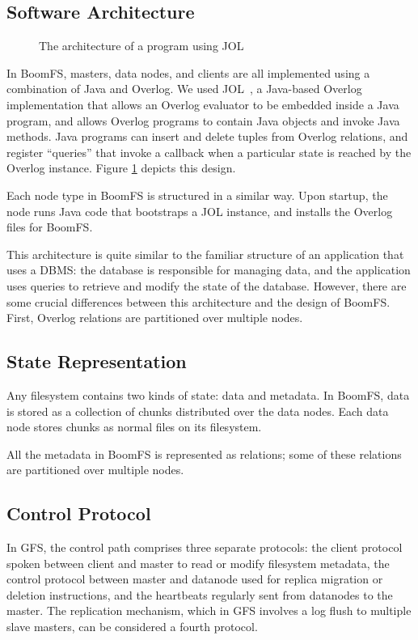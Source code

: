 \documentclass{article}
\begin{document}
\subsection{Software Architecture}
\begin{figure}
\centering
{}
\caption{The architecture of a program using JOL}
\label{fig:jol-arch}
\end{figure}
In BoomFS, masters, data nodes, and clients are all implemented using
a combination of Java and Overlog. We used JOL~\cite{jol}, a
Java-based Overlog implementation that allows an Overlog evaluator to
be embedded inside a Java program, and allows Overlog programs to
contain Java objects and invoke Java methods. Java programs can insert
and delete tuples from Overlog relations, and register ``queries''
that invoke a callback when a particular state is reached by the
Overlog instance. Figure \ref{fig:jol-arch} depicts this design.

Each node type in BoomFS is structured in a similar way. Upon startup,
the node runs Java code that bootstraps a JOL instance, and installs
the Overlog files for BoomFS.

This architecture is quite similar to the familiar structure of an
application that uses a DBMS: the database is responsible for managing
data, and the application uses queries to retrieve and modify the
state of the database. However, there are some crucial differences
between this architecture and the design of BoomFS. First, Overlog
relations are partitioned over multiple nodes.

\subsection{State Representation}
Any filesystem contains two kinds of state: data and metadata. In
BoomFS, data is stored as a collection of chunks distributed over the
data nodes. Each data node stores chunks as normal files on its
filesystem.

All the metadata in BoomFS is represented as relations; some of these
relations are partitioned over multiple nodes.

\subsection{Control Protocol}
In GFS, the control path comprises three separate protocols: the client protocol spoken between client and master to read or modify filesystem metadata, the control protocol between master and datanode used for replica migration or deletion instructions, and the heartbeats regularly sent from datanodes to the master.  The replication mechanism, which in GFS involves a log flush to multiple slave masters, can be considered a fourth protocol.
\end{document}
